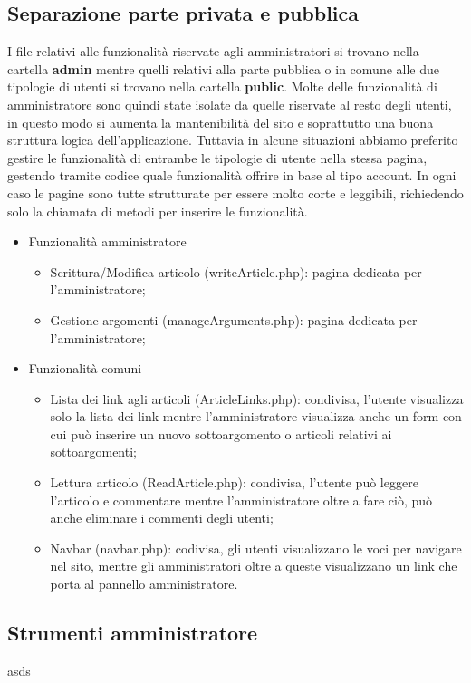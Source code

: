 \documentclass[12pt]{article}
\begin{document}
	\subsection{Separazione parte privata e pubblica}
	I file relativi alle funzionalità riservate agli amministratori si trovano nella cartella \textbf{admin} mentre quelli relativi alla parte pubblica o in comune alle due tipologie di utenti si trovano nella cartella \textbf{public}. Molte delle funzionalità di amministratore sono quindi state isolate da quelle riservate al resto degli utenti, in questo modo si aumenta la mantenibilità del sito e soprattutto una buona struttura logica dell'applicazione. Tuttavia in alcune situazioni abbiamo preferito gestire le funzionalità di entrambe le tipologie di utente nella stessa pagina, gestendo tramite codice quale funzionalità offrire in base al tipo account. In ogni caso le pagine sono tutte strutturate per essere molto corte e leggibili, richiedendo solo la chiamata di metodi per inserire le funzionalità.
	\begin{itemize}
		\item Funzionalità amministratore
			\begin{itemize}
				\item Scrittura/Modifica articolo (writeArticle.php): pagina dedicata per l'amministratore;
				\item Gestione argomenti (manageArguments.php): pagina dedicata per l'amministratore;
			\end{itemize}
		\item Funzionalità comuni
			\begin{itemize}
				\item Lista dei link agli articoli (ArticleLinks.php): condivisa, l'utente visualizza solo la lista dei link mentre l'amministratore visualizza anche un form con cui può inserire un nuovo sottoargomento o articoli relativi ai sottoargomenti;
				\item Lettura articolo (ReadArticle.php): condivisa, l'utente può leggere l'articolo e commentare mentre l'amministratore oltre a fare ciò, può anche eliminare i commenti degli utenti;
				\item Navbar (navbar.php): codivisa, gli utenti visualizzano le voci per navigare nel sito, mentre gli amministratori oltre a queste visualizzano un link che porta al pannello amministratore.
			\end{itemize}
	\end{itemize}
	\subsection{Strumenti amministratore}
	asds
\end{document}
